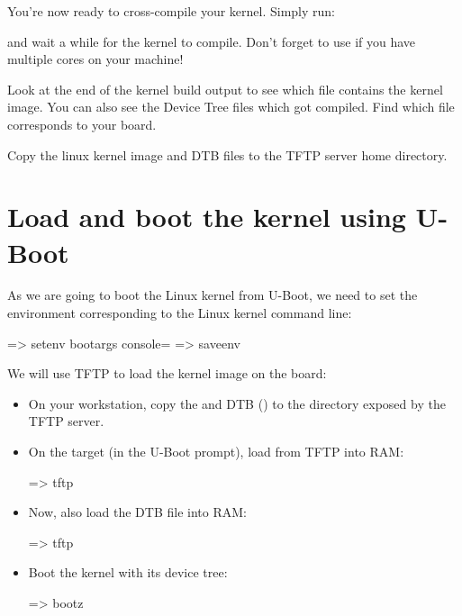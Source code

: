 You're now ready to cross-compile your kernel. Simply run:


and wait a while for the kernel to compile. Don't forget to use
 if you have multiple cores on your machine!

Look at the end of the kernel build output to see which file contains
the kernel image. You can also see the Device Tree  files
which got compiled. Find which  file corresponds to your
board.

Copy the linux kernel image and DTB files to the TFTP server
home directory.

\section{Load and boot the kernel using U-Boot}

As we are going to boot the Linux kernel from U-Boot,
we need to set the  environment corresponding
to the Linux kernel command line:

\begin{ubootinput}
=> setenv bootargs console=%
=> saveenv
\end{ubootinput}
We will use TFTP to load the kernel image on the board:

\begin{itemize}

\item On your workstation, copy the  and DTB
(\texttt\dtbname) to the directory exposed by the TFTP server.

\item On the target (in the U-Boot prompt), load  from
TFTP into RAM:
\begin{ubootinput}
=> tftp %
\end{ubootinput}

\item Now, also load the DTB file into RAM:
\begin{ubootinput}
=> tftp %
\end{ubootinput}

\item Boot the kernel with its device tree:
\begin{ubootinput}
=> bootz %
\end{ubootinput}

\end{itemize}

